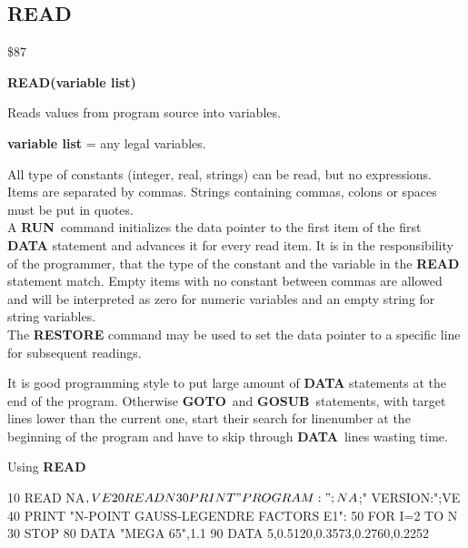 
\newpage
\subsection{READ}
\begin{description}[leftmargin=3cm,style=nextline]
\item [Token:] \$87
\item [Format:] {\bf READ(variable list)}
\item [Usage:]  Reads values from program source into variables.

                {\bf variable list} = any legal variables.

               All type of constants (integer, real,
               strings) can be read, but no expressions.
               Items are separated by commas.
               Strings containing commas, colons or spaces must be put
               in quotes. \\
               A {\bf RUN} command initializes the data pointer
               to the first item of the first {\bf DATA} statement
               and advances it for every read item. It is in the
               responsibility of the programmer, that the type of
               the constant and the variable in the {\bf READ}
               statement match. Empty items with no constant
               between commas are allowed and will be interpreted as
               zero for numeric variables and an empty string for
               string variables. \\
               The {\bf RESTORE} command may be used to set the
               data pointer to a specific line for subsequent
               readings.

\item [Remarks:] It is good programming style to put large amount of
               {\bf DATA} statements at the end of the program.
               Otherwise {\bf GOTO} and {\bf GOSUB} statements, with
               target lines lower than the current one,
               start their search for linenumber at the beginning of
               the program and have to skip through {\bf DATA} lines
               wasting time.
\item [Example:] Using {\bf READ}
\begin{screenoutput}
10 READ NA$, VE
20 READ N%
30 PRINT "PROGRAM:";NA$;"   VERSION:";VE
40 PRINT "N-POINT GAUSS-LEGENDRE FACTORS E1":
50 FOR I=2 TO N%
30 STOP
80 DATA "MEGA 65",1.1
90 DATA 5,0.5120,0.3573,0.2760,0.2252
\end{screenoutput}
\end{description}

